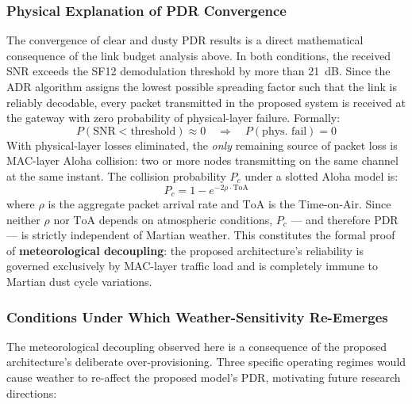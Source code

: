 \documentclass{ijuc}
\begin{document}
\subsubsection{Physical Explanation of PDR Convergence}
The convergence of clear and dusty PDR results is a direct mathematical consequence of the link budget analysis above. In both conditions, the received SNR exceeds the SF12 demodulation threshold by more than 21~dB. Since the ADR algorithm assigns the lowest possible spreading factor such that the link is reliably decodable, every packet transmitted in the proposed system is received at the gateway with zero probability of physical-layer failure. Formally:
\begin{equation}
    P(\text{SNR} < \text{threshold}) \approx 0 \quad \Rightarrow \quad P(\text{phys.\ fail}) = 0
\end{equation}
With physical-layer losses eliminated, the \emph{only} remaining source of packet loss is MAC-layer Aloha collision: two or more nodes transmitting on the same channel at the same instant. The collision probability $P_c$ under a slotted Aloha model is:
\begin{equation}
    P_c = 1 - e^{-2\rho \cdot \text{ToA}}
\end{equation}
where $\rho$ is the aggregate packet arrival rate and $\text{ToA}$ is the Time-on-Air. Since neither $\rho$ nor $\text{ToA}$ depends on atmospheric conditions, $P_c$ --- and therefore PDR --- is strictly independent of Martian weather. This constitutes the formal proof of \textbf{meteorological decoupling}: the proposed architecture's reliability is governed exclusively by MAC-layer traffic load and is completely immune to Martian dust cycle variations.

\subsubsection{Conditions Under Which Weather-Sensitivity Re-Emerges}
\label{subsubsec:future_sensitivity}
The meteorological decoupling observed here is a consequence of the proposed architecture's deliberate over-provisioning. Three specific operating regimes would cause weather to re-affect the proposed model's PDR, motivating future research directions:
\end{document}
